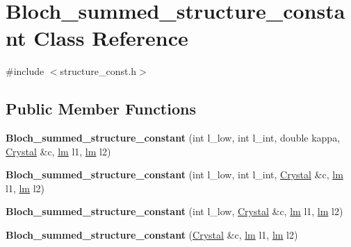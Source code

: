\hypertarget{classBloch__summed__structure__constant}{}\section{Bloch\+\_\+summed\+\_\+structure\+\_\+constant Class Reference}
\label{classBloch__summed__structure__constant}


{\ttfamily \#include $<$structure\+\_\+const.\+h$>$}

\subsection*{Public Member Functions}
\begin{DoxyCompactItemize}
\item 
\mbox{\label{classBloch__summed__structure__constant_a76a707b0527f92350141011264fa1f29}} 
{\bfseries Bloch\+\_\+summed\+\_\+structure\+\_\+constant} (int l\+\_\+low, int l\+\_\+int, double kappa, \hyperlink{classCrystal}{Crystal} \&c, \hyperlink{structlm}{lm} l1, \hyperlink{structlm}{lm} l2)
\item 
\mbox{\label{classBloch__summed__structure__constant_a6a12a7cf46a1a9b52ac6852df7a87c91}} 
{\bfseries Bloch\+\_\+summed\+\_\+structure\+\_\+constant} (int l\+\_\+low, int l\+\_\+int, \hyperlink{classCrystal}{Crystal} \&c, \hyperlink{structlm}{lm} l1, \hyperlink{structlm}{lm} l2)
\item 
\mbox{\label{classBloch__summed__structure__constant_a9ec01b0c1f625a2beec618d6da838b48}} 
{\bfseries Bloch\+\_\+summed\+\_\+structure\+\_\+constant} (int l\+\_\+low, \hyperlink{classCrystal}{Crystal} \&c, \hyperlink{structlm}{lm} l1, \hyperlink{structlm}{lm} l2)
\item 
\mbox{\label{classBloch__summed__structure__constant_a5a0864288d912b93ac8cdb10f55f338d}} 
{\bfseries Bloch\+\_\+summed\+\_\+structure\+\_\+constant} (\hyperlink{classCrystal}{Crystal} \&c, \hyperlink{structlm}{lm} l1, \hyperlink{structlm}{lm} l2)
\item 
\mbox{\label{classBloch__summed__structure__constant_a43503e7c75fb86c7646ec9373c7bd5fc}} 

\end{DoxyCompactItemize}
